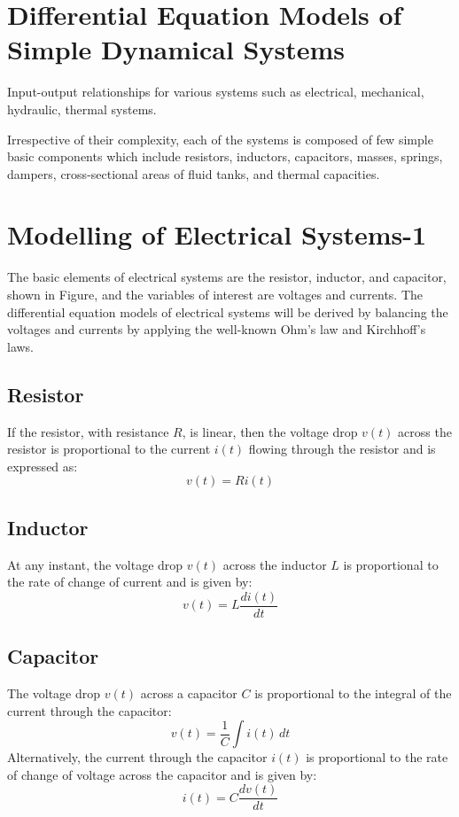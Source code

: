 \documentclass[../notes-main.tex]{subfiles}
\begin{document}
\section{Differential Equation Models of Simple Dynamical Systems}

Input-output relationships for various systems such as electrical, mechanical, hydraulic, thermal systems.

Irrespective of their complexity, each of the systems is composed of few simple basic components which include resistors, inductors, capacitors, masses, springs, dampers, cross-sectional areas of fluid tanks, and thermal capacities.

\section{Modelling of Electrical Systems-1}

The basic elements of electrical systems are the resistor, inductor, and capacitor, shown in Figure, and the variables of interest are voltages and currents. The differential equation models of electrical systems will be derived by balancing the voltages and currents by applying the well-known Ohm’s law and Kirchhoff’s laws.

\subsection{Resistor}

If the resistor, with resistance \( R \), is linear, then the voltage drop \( v(t) \) across the resistor is proportional to the current \( i(t) \) flowing through the resistor and is expressed as:
\[
v(t) = R i(t)
\]

\subsection{Inductor}

At any instant, the voltage drop \( v(t) \) across the inductor \( L \) is proportional to the rate of change of current and is given by:
\[
v(t) = L \frac{di(t)}{dt}
\]

\subsection{Capacitor}

The voltage drop \( v(t) \) across a capacitor \( C \) is proportional to the integral of the current through the capacitor:
\[
v(t) = \frac{1}{C} \int i(t) \, dt
\]
Alternatively, the current through the capacitor \( i(t) \) is proportional to the rate of change of voltage across the capacitor and is given by:
\[
i(t) = C \frac{dv(t)}{dt}
\]
\end{document}
